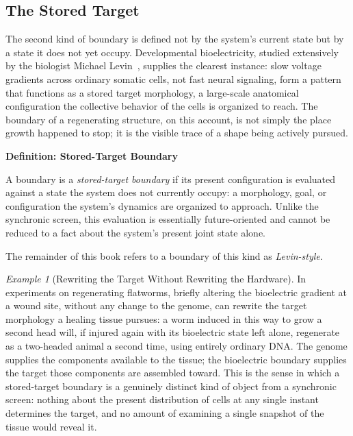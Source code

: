 \documentclass[11pt,fleqn]{book}
\numberwithin{equation}{chapter}
\newenvironment{definition}[1]
  {\begin{definitionEnv}
   \noindent\textbf{Definition: #1}\par\smallskip}
  {\end{definitionEnv}}
\theoremstyle{plain}
\theoremstyle{definition}
\theoremstyle{remark}
\newtheorem{example}[theorem]{Example}
\begin{document}
\subsection{The Stored Target}

The second kind of boundary is defined not by the system's current state but by a state it does not yet occupy. Developmental bioelectricity, studied extensively by the biologist Michael Levin~\cite{levin2021,levin2023}, supplies the clearest instance: slow voltage gradients across ordinary somatic cells, not fast neural signaling, form a pattern that functions as a stored target morphology, a large-scale anatomical configuration the collective behavior of the cells is organized to reach. The boundary of a regenerating structure, on this account, is not simply the place growth happened to stop; it is the visible trace of a shape being actively pursued.

\begin{definition}{Stored-Target Boundary}
A boundary is a \emph{stored-target boundary} if its present configuration is evaluated against a state the system does not currently occupy: a morphology, goal, or configuration the system's dynamics are organized to approach. Unlike the synchronic screen, this evaluation is essentially future-oriented and cannot be reduced to a fact about the system's present joint state alone.
\end{definition}

The remainder of this book refers to a boundary of this kind as \emph{Levin-style}.

\begin{example}[Rewriting the Target Without Rewriting the Hardware]
In experiments on regenerating flatworms, briefly altering the bioelectric gradient at a wound site, without any change to the genome, can rewrite the target morphology a healing tissue pursues: a worm induced in this way to grow a second head will, if injured again with its bioelectric state left alone, regenerate as a two-headed animal a second time, using entirely ordinary DNA. The genome supplies the components available to the tissue; the bioelectric boundary supplies the target those components are assembled toward. This is the sense in which a stored-target boundary is a genuinely distinct kind of object from a synchronic screen: nothing about the present distribution of cells at any single instant determines the target, and no amount of examining a single snapshot of the tissue would reveal it.
\end{example}
\end{document}
